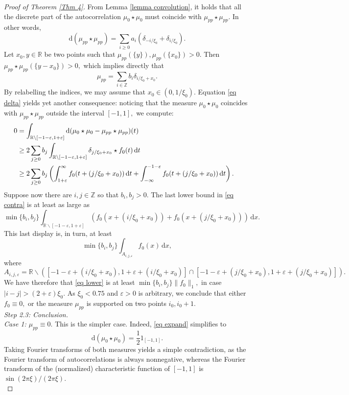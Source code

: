 \documentclass[11pt, reqno]{amsart}
\newcommand{\mmd}{ \mathrm{d}}
\newcommand{\s}{\star}
\numberwithin{equation}{section}
\newcommand{\R}{{\mathbb R}}
\newcommand{\Z}{{\mathbb Z}}
\newcommand{\eps}{{\varepsilon}}
\begin{document}
\begin{proof}[Proof of Theorem \ref{Thm 4}]
From Lemma \ref{lemma convolution}, it holds that all the discrete part of the autocorrelation $\mu_0 \s \mu_0$ must coincide with $\mu_{pp} \s \mu_{pp}.$ In other words, 
\[
\mmd(\mu_{pp} \s \mu_{pp}) = \sum_{i \ge 0} a_i (\delta_{-i/\xi_0} + \delta_{i/\xi_0}).
\]
Let $x_0,y \in \R$ be two points such that $\mu_{pp}(\{y\}),\mu_{pp}(\{x_0\}) > 0.$ Then $\mu_{pp} \s \mu_{pp}(\{y - x_0\}) > 0,$ which implies directly 
that 
\[
\mu_{pp} = \sum_{i \in \Z} b_i \delta_{i/\xi_0 + x_0}.
\]
By relabelling the indices, we may assume that $x_0 \in (0,1/\xi_0).$ Equation \eqref{eq delta} yields yet another consequence: noticing that the measure $\mu_0 \s \mu_0$ coincides with $\mu_{pp} \s \mu_{pp}$
outside the interval $[-1,1],$ we compute:
\begin{align}\label{eq contra} 
0 &= \int_{\R\backslash[-1-\eps,1+\eps]} \mmd(\mu_0 \s \mu_0 - \mu_{pp} \s \mu_{pp})(t) \cr 
  &\ge 2 \sum_{j \ge 0} b_j \int_{\R \backslash [-1-\eps,1+\eps]} \delta_{j/\xi_0 + x_0}\s f_0(t) \, \mmd t \cr 
  &\ge 2 \sum_{j \ge 0} b_j \left(\int_{1+\eps}^{\infty}f_0(t+(j/\xi_0 + x_0)) \, \mmd t + \int_{-\infty}^{-1-\eps} f_0(t+(j/\xi_0+ x_0)) \, \mmd t\right). \cr 
\end{align}
Suppose now there are $i,j \in \Z$ so that $b_i,b_j > 0.$ The last lower bound in \eqref{eq contra} is at least as large as 
\[
\min\{b_i,b_j\} \int_{\R \backslash [-1-\eps,1+\eps]} (f_0(x + (i/\xi_0 + x_0)) + f_0(x + (j/\xi_0 + x_0))) \, \mmd x.
\]
This last display is, in turn, at least 
\begin{equation}\label{eq lower}
\min\{b_i,b_j\} \int_{A_{i,j,\eps}} f_0(x) \, \mmd x,
\end{equation}
where 
$$A_{i,j,\eps} = \R \backslash ([-1-\eps + (i/\xi_0 + x_0), 1 + \eps + (i/\xi_0 + x_0)] \cap [-1-\eps+ (j/\xi_0 + x_0),1+\eps + (j/\xi_0 + x_0)]).$$ 
We have therefore that \eqref{eq lower} is at least $\min\{b_i,b_j\} \|f_0\|_1,$ in case $|i-j| > (2+\eps) \xi_0.$ As $\xi_0  < 0.75$ and $\eps>0$ is arbitrary, we conclude that either $f_0 \equiv 0,$ or the measure 
$\mu_{pp}$ is supported on two points $i_0, i_0 + 1.$ \\

\noindent\textit{Step 2.3: Conclusion.} \\

\noindent\textit{Case 1: $\mu_{pp} \equiv 0.$} This is the simpler case. Indeed, \eqref{eq expand} simplifies to 
\[
\mmd (\mu_0 \s \mu_0) = \frac{1}{2} 1_{[-1,1]}.
\]
Taking Fourier transforms of both measures yields a simple contradiction, as the Fourier transform of autocorrelations is always nonnegative, whereas the Fourier transform of the (normalized) characteristic function 
of $[-1,1]$ is $\sin(2\pi \xi)/(2\pi \xi).$ \\


\end{proof}
\end{document}
